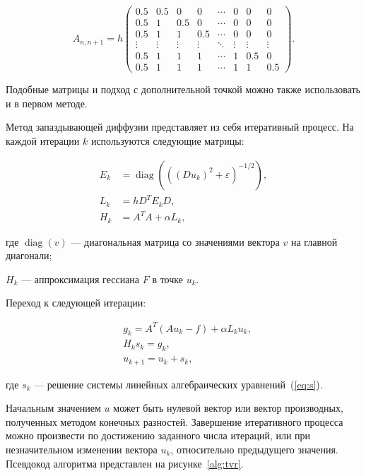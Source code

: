 \begin{equation}
A_{n, n+1} = h
\begin{pmatrix}
0.5 & 0.5 &   0 &   0 & \cdots & 0 &   0 &   0 \\
0.5 &   1 & 0.5 &   0 & \cdots & 0 &   0 &   0 \\
0.5 &   1 &   1 & 0.5 & \cdots & 0 &   0 &   0 \\
\vdots & \vdots & \vdots & \vdots & \ddots & \vdots & \vdots & \vdots \\
0.5 &   1 &   1 &   1 & \cdots & 1 & 0.5 &   0 \\
0.5 &   1 &   1 &   1 & \cdots & 1 &   1 & 0.5 
\end{pmatrix}.
\end{equation}

Подобные матрицы и подход с дополнительной точкой можно также использовать и в первом методе.

Метод запаздывающей диффузии представляет из себя итеративный процесс. На каждой итерации $k$ используются следующие матрицы:

\begin{align}
E_k &= \operatorname{diag}(((D u_k)^2 + \varepsilon)^{-1/2}),\\
L_k &= h D^T E_k D,\\
H_k &= A^T A + \alpha L_k,
\end{align}

где $\operatorname{diag}(v)$ --- диагональная матрица со значениями вектора $v$ на главной диагонали;\par
$H_k$ --- аппроксимация гессиана $F$ в точке $u_k$.

Переход к следующей итерации:

\begin{align}
& g_k = A^T (A u_k - f) + \alpha L_k u_k, \\
\label{eq:s}
& H_k s_k = g_k, \\
& u_{k+1} = u_k + s_k,
\end{align}

где $s_k$ --- решение системы линейных алгебраических уравнений~(\ref{eq:s}).

Начальным значением $u$ может быть нулевой вектор или вектор производных, полученных методом конечных разностей.
Завершение итеративного процесса можно произвести по достижению заданного числа итераций, или при незначительном изменении вектора $u_k$, относительно предыдущего значения. Псевдокод алгоритма представлен на рисунке~\ref{alg:tvr}.

